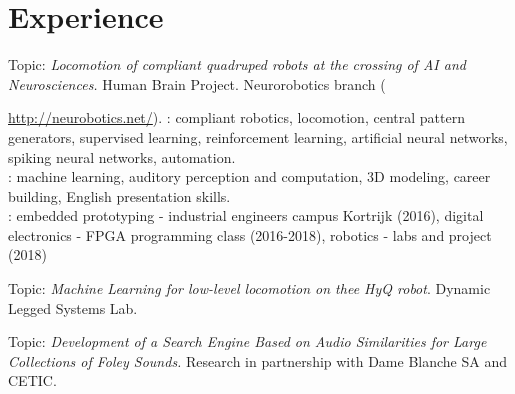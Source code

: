 \documentclass[a4paper]{deedy-resume} %
\begin{document}
\section{Experience}
\vspace{5pt}
Topic: \textit{Locomotion of compliant quadruped robots at the crossing of AI and Neurosciences.} Human Brain Project. Neurorobotics branch ({\url{http://neurobotics.net/}). : compliant robotics, locomotion, central pattern generators, supervised learning, reinforcement learning, artificial neural networks, spiking neural networks, automation. \\
: machine learning, auditory perception and computation, 3D modeling, career building, English presentation skills. \\
: embedded prototyping - industrial engineers campus Kortrijk (2016), digital electronics - FPGA programming class (2016-2018), robotics - labs and project (2018)
\vspace{9pt}


Topic: \textit{Machine Learning for low-level locomotion on thee HyQ robot}. Dynamic Legged Systems Lab.

\vspace{9pt}

Topic: \textit{Development of a Search Engine Based on Audio Similarities for Large Collections of Foley Sounds.} Research in partnership with Dame Blanche SA and CETIC.

\vspace{9pt}


}
\end{document}
